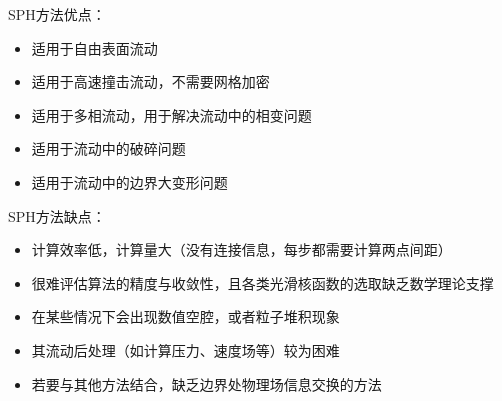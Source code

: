 \begin{frame}

    SPH方法优点：
    \begin{itemize}
        \item 适用于自由表面流动
        \item 适用于高速撞击流动，不需要网格加密
        \item 适用于多相流动，用于解决流动中的相变问题
        \item 适用于流动中的破碎问题
        \item 适用于流动中的边界大变形问题
    \end{itemize}

    SPH方法缺点：
    \begin{itemize}
        \item 计算效率低，计算量大（没有连接信息，每步都需要计算两点间距）
        \item 很难评估算法的精度与收敛性，且各类光滑核函数的选取缺乏数学理论支撑
        \item 在某些情况下会出现数值空腔，或者粒子堆积现象
        \item 其流动后处理（如计算压力、速度场等）较为困难
        \item 若要与其他方法结合，缺乏边界处物理场信息交换的方法
    \end{itemize}

\end{frame}